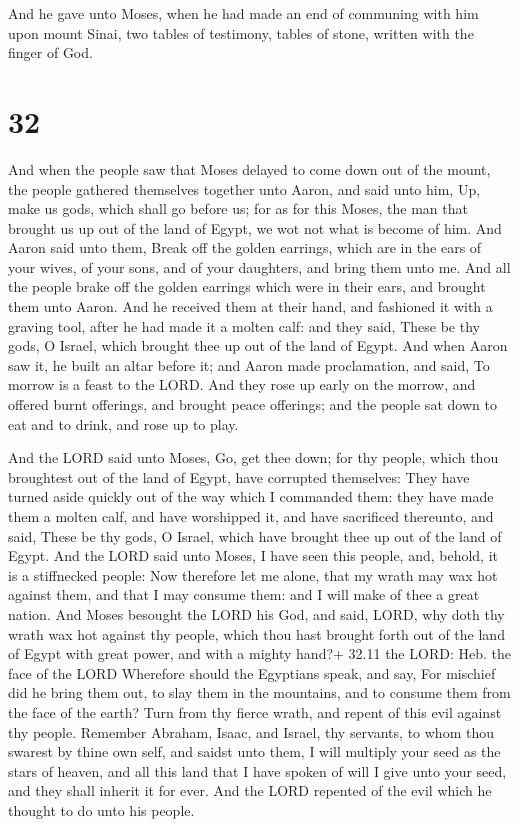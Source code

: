 And he gave unto Moses, when he had made an end of
communing with him upon mount Sinai, two tables of testimony, tables of
stone, written with the finger of God.

\hypertarget{section-31}{%
\section{32}\label{section-31}}

 And when the people saw that Moses delayed to come down out
of the mount, the people gathered themselves together unto Aaron, and
said unto him, Up, make us gods, which shall go before us; for as for
this Moses, the man that brought us up out of the land of Egypt, we wot
not what is become of him.  And Aaron said unto them, Break
off the golden earrings, which are in the ears of your wives, of your
sons, and of your daughters, and bring them unto me.  And
all the people brake off the golden earrings which were in their ears,
and brought them unto Aaron.  And he received them at their
hand, and fashioned it with a graving tool, after he had made it a
molten calf: and they said, These be thy gods, O Israel, which brought
thee up out of the land of Egypt.  And when Aaron saw it, he
built an altar before it; and Aaron made proclamation, and said, To
morrow is a feast to the LORD.  And they rose up early on
the morrow, and offered burnt offerings, and brought peace offerings;
and the people sat down to eat and to drink, and rose up to play.

 And the LORD said unto Moses, Go, get thee down; for thy
people, which thou broughtest out of the land of Egypt, have corrupted
themselves:  They have turned aside quickly out of the way
which I commanded them: they have made them a molten calf, and have
worshipped it, and have sacrificed thereunto, and said, These be thy
gods, O Israel, which have brought thee up out of the land of Egypt.
 And the LORD said unto Moses, I have seen this people, and,
behold, it is a stiffnecked people:  Now therefore let me
alone, that my wrath may wax hot against them, and that I may consume
them: and I will make of thee a great nation.  And Moses
besought the LORD his God, and said, LORD, why doth thy wrath wax hot
against thy people, which thou hast brought forth out of the land of
Egypt with great power, and with a mighty hand?+ 32.11 the LORD: Heb.
the face of the LORD  Wherefore should the Egyptians speak,
and say, For mischief did he bring them out, to slay them in the
mountains, and to consume them from the face of the earth? Turn from thy
fierce wrath, and repent of this evil against thy people. 
Remember Abraham, Isaac, and Israel, thy servants, to whom thou swarest
by thine own self, and saidst unto them, I will multiply your seed as
the stars of heaven, and all this land that I have spoken of will I give
unto your seed, and they shall inherit it for ever.  And
the LORD repented of the evil which he thought to do unto his people.

